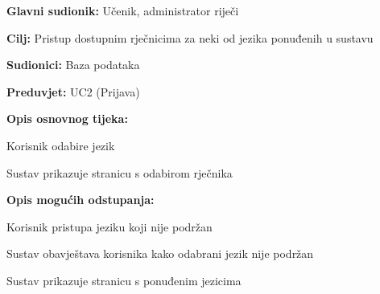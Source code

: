 						\noindent {}
					\begin{packed_item}
						
						\item \textbf{Glavni sudionik: }Učenik, administrator riječi
						\item  \textbf{Cilj:} Pristup dostupnim rječnicima za neki od jezika ponuđenih u sustavu
						\item  \textbf{Sudionici:} Baza podataka
						\item  \textbf{Preduvjet:} UC2 (Prijava)
						\item  \textbf{Opis osnovnog tijeka:}
						
						\item[] \begin{packed_enum}
							
							\item Korisnik odabire jezik
							\item Sustav prikazuje stranicu s odabirom rječnika
						\end{packed_enum}
						
						\item  \textbf{Opis mogućih odstupanja:}
						
						\item[] \begin{packed_item}
							
							\item[1.a] Korisnik pristupa jeziku koji nije podržan
							\item[] \begin{packed_enum}
								
								\item Sustav obavještava korisnika kako odabrani jezik nije podržan
								\item Sustav prikazuje stranicu s ponuđenim jezicima
								
							\end{packed_enum}
							
						\end{packed_item}
						
					\end{packed_item}
					
